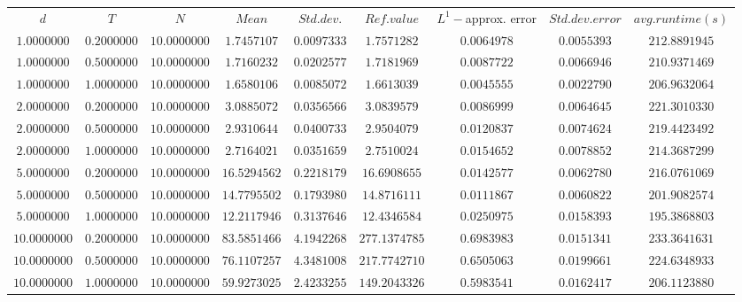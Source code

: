 \begin{tabular}{ccccccccc}
$d$ & $T$ & $N$ & $Mean$ & $Std. dev.$ & $Ref. value$ & $L^1-$approx. error & $Std. dev. error$ & $avg. runtime (s)$\\
$1.0000000$ & $0.2000000$ & $10.0000000$ & $1.7457107$ & $0.0097333$ & $1.7571282$ & $0.0064978$ & $0.0055393$ & $212.8891945$\\
$1.0000000$ & $0.5000000$ & $10.0000000$ & $1.7160232$ & $0.0202577$ & $1.7181969$ & $0.0087722$ & $0.0066946$ & $210.9371469$\\
$1.0000000$ & $1.0000000$ & $10.0000000$ & $1.6580106$ & $0.0085072$ & $1.6613039$ & $0.0045555$ & $0.0022790$ & $206.9632064$\\
$2.0000000$ & $0.2000000$ & $10.0000000$ & $3.0885072$ & $0.0356566$ & $3.0839579$ & $0.0086999$ & $0.0064645$ & $221.3010330$\\
$2.0000000$ & $0.5000000$ & $10.0000000$ & $2.9310644$ & $0.0400733$ & $2.9504079$ & $0.0120837$ & $0.0074624$ & $219.4423492$\\
$2.0000000$ & $1.0000000$ & $10.0000000$ & $2.7164021$ & $0.0351659$ & $2.7510024$ & $0.0154652$ & $0.0078852$ & $214.3687299$\\
$5.0000000$ & $0.2000000$ & $10.0000000$ & $16.5294562$ & $0.2218179$ & $16.6908655$ & $0.0142577$ & $0.0062780$ & $216.0761069$\\
$5.0000000$ & $0.5000000$ & $10.0000000$ & $14.7795502$ & $0.1793980$ & $14.8716111$ & $0.0111867$ & $0.0060822$ & $201.9082574$\\
$5.0000000$ & $1.0000000$ & $10.0000000$ & $12.2117946$ & $0.3137646$ & $12.4346584$ & $0.0250975$ & $0.0158393$ & $195.3868803$\\
$10.0000000$ & $0.2000000$ & $10.0000000$ & $83.5851466$ & $4.1942268$ & $277.1374785$ & $0.6983983$ & $0.0151341$ & $233.3641631$\\
$10.0000000$ & $0.5000000$ & $10.0000000$ & $76.1107257$ & $4.3481008$ & $217.7742710$ & $0.6505063$ & $0.0199661$ & $224.6348933$\\
$10.0000000$ & $1.0000000$ & $10.0000000$ & $59.9273025$ & $2.4233255$ & $149.2043326$ & $0.5983541$ & $0.0162417$ & $206.1123880$\\
\end{tabular}
